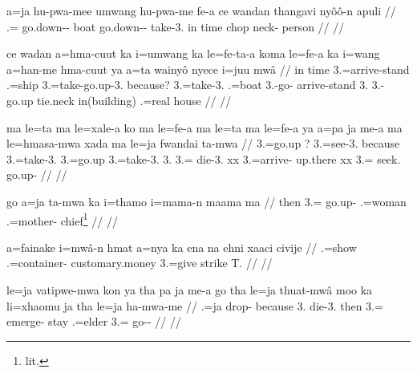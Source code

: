\documentclass{article}
\begin{document}
\a
\begingl
\gla a=ja hu-pwa-mee umwang hu-pwa-me fe-a ce wandan thangavi nyôô-n apuli
// .= go.down-- boat go.down-- take-3. in time chop neck- person
// \glft {}
// \endgl

\a
\begingl
\gla ce wadan a=hma-cuut ka i=umwang ka le=fe-ta-a koma le=fe-a ka i=wang a=han-me hma-cuut ya a=ta wainyô nyece i=juu mwâ
// \glb in time 3.=arrive-stand  .=ship  3.=take-go.up-3. because? 3.=take-3.  .=boat 3.-go- arrive-stand 3. 3.-go.up tie.neck in(building) .=real house
// \glft {}
// \endgl

\a
\begingl
\gla ma le=ta ma le=xale-a ko ma le=fe-a ma le=ta ma le=fe-a ya a=pa ja me-a ma le=hmasa-mwa xada ma le=ja fwandai ta-mwa
// \glb {} 3.=go.up ? 3.=see-3. because  3.=take-3.  3.=go.up  3.=take-3. 3. 3.=  die-3. xx 3.=arrive- up.there xx 3.= seek. go.up-
// \glft  {}
// \endgl

\a
\begingl
\gla 
go a=ja ta-mwa ka i=thamo i=mama-n maama ma
// \glb then 3.= go.up-  .=woman .=mother- chief\footnote{lit. } 
// \glft {}
// \endgl

\a
\begingl
\gla 
a=fainake i=mwâ-n hmat a=nya ka ena na ehni xaaci civije
// .=show .=container- customary.money 3.=give     strike T.
// \glft {}
// \endgl

\a
\begingl
\gla 
le=ja vatipwe-mwa kon ya tha pa ja me-a go tha le=ja thuat-mwâ moo ka li=xhaomu ja tha le=ja ha-mwa-me
// .=ja drop- because 3.    die-3. then  3.= emerge- stay  .=elder   3.= go--
// \glft  {}
// \endgl
\end{document}
